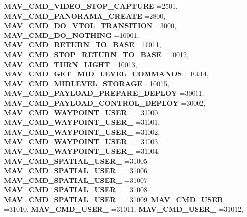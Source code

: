 \begin{DoxyCompactItemize}
\newline
\textbf{ M\+A\+V\+\_\+\+C\+M\+D\+\_\+\+V\+I\+D\+E\+O\+\_\+\+S\+T\+O\+P\+\_\+\+C\+A\+P\+T\+U\+RE} =2501, 
\textbf{ M\+A\+V\+\_\+\+C\+M\+D\+\_\+\+P\+A\+N\+O\+R\+A\+M\+A\+\_\+\+C\+R\+E\+A\+TE} =2800, 
\textbf{ M\+A\+V\+\_\+\+C\+M\+D\+\_\+\+D\+O\+\_\+\+V\+T\+O\+L\+\_\+\+T\+R\+A\+N\+S\+I\+T\+I\+ON} =3000, 
\textbf{ M\+A\+V\+\_\+\+C\+M\+D\+\_\+\+D\+O\+\_\+\+N\+O\+T\+H\+I\+NG} =10001, 
\newline
\textbf{ M\+A\+V\+\_\+\+C\+M\+D\+\_\+\+R\+E\+T\+U\+R\+N\+\_\+\+T\+O\+\_\+\+B\+A\+SE} =10011, 
\textbf{ M\+A\+V\+\_\+\+C\+M\+D\+\_\+\+S\+T\+O\+P\+\_\+\+R\+E\+T\+U\+R\+N\+\_\+\+T\+O\+\_\+\+B\+A\+SE} =10012, 
\textbf{ M\+A\+V\+\_\+\+C\+M\+D\+\_\+\+T\+U\+R\+N\+\_\+\+L\+I\+G\+HT} =10013, 
\textbf{ M\+A\+V\+\_\+\+C\+M\+D\+\_\+\+G\+E\+T\+\_\+\+M\+I\+D\+\_\+\+L\+E\+V\+E\+L\+\_\+\+C\+O\+M\+M\+A\+N\+DS} =10014, 
\newline
\textbf{ M\+A\+V\+\_\+\+C\+M\+D\+\_\+\+M\+I\+D\+L\+E\+V\+E\+L\+\_\+\+S\+T\+O\+R\+A\+GE} =10015, 
\textbf{ M\+A\+V\+\_\+\+C\+M\+D\+\_\+\+P\+A\+Y\+L\+O\+A\+D\+\_\+\+P\+R\+E\+P\+A\+R\+E\+\_\+\+D\+E\+P\+L\+OY} =30001, 
\textbf{ M\+A\+V\+\_\+\+C\+M\+D\+\_\+\+P\+A\+Y\+L\+O\+A\+D\+\_\+\+C\+O\+N\+T\+R\+O\+L\+\_\+\+D\+E\+P\+L\+OY} =30002, 
\textbf{ M\+A\+V\+\_\+\+C\+M\+D\+\_\+\+W\+A\+Y\+P\+O\+I\+N\+T\+\_\+\+U\+S\+E\+R\+\_} =31000, 
\newline
\textbf{ M\+A\+V\+\_\+\+C\+M\+D\+\_\+\+W\+A\+Y\+P\+O\+I\+N\+T\+\_\+\+U\+S\+E\+R\+\_} =31001, 
\textbf{ M\+A\+V\+\_\+\+C\+M\+D\+\_\+\+W\+A\+Y\+P\+O\+I\+N\+T\+\_\+\+U\+S\+E\+R\+\_} =31002, 
\textbf{ M\+A\+V\+\_\+\+C\+M\+D\+\_\+\+W\+A\+Y\+P\+O\+I\+N\+T\+\_\+\+U\+S\+E\+R\+\_} =31003, 
\textbf{ M\+A\+V\+\_\+\+C\+M\+D\+\_\+\+W\+A\+Y\+P\+O\+I\+N\+T\+\_\+\+U\+S\+E\+R\+\_} =31004, 
\newline
\textbf{ M\+A\+V\+\_\+\+C\+M\+D\+\_\+\+S\+P\+A\+T\+I\+A\+L\+\_\+\+U\+S\+E\+R\+\_} =31005, 
\textbf{ M\+A\+V\+\_\+\+C\+M\+D\+\_\+\+S\+P\+A\+T\+I\+A\+L\+\_\+\+U\+S\+E\+R\+\_} =31006, 
\textbf{ M\+A\+V\+\_\+\+C\+M\+D\+\_\+\+S\+P\+A\+T\+I\+A\+L\+\_\+\+U\+S\+E\+R\+\_} =31007, 
\textbf{ M\+A\+V\+\_\+\+C\+M\+D\+\_\+\+S\+P\+A\+T\+I\+A\+L\+\_\+\+U\+S\+E\+R\+\_} =31008, 
\newline
\textbf{ M\+A\+V\+\_\+\+C\+M\+D\+\_\+\+S\+P\+A\+T\+I\+A\+L\+\_\+\+U\+S\+E\+R\+\_} =31009, 
\textbf{ M\+A\+V\+\_\+\+C\+M\+D\+\_\+\+U\+S\+E\+R\+\_} =31010, 
\textbf{ M\+A\+V\+\_\+\+C\+M\+D\+\_\+\+U\+S\+E\+R\+\_} =31011, 
\textbf{ M\+A\+V\+\_\+\+C\+M\+D\+\_\+\+U\+S\+E\+R\+\_} =31012, 
\newline

\end{DoxyCompactItemize}
